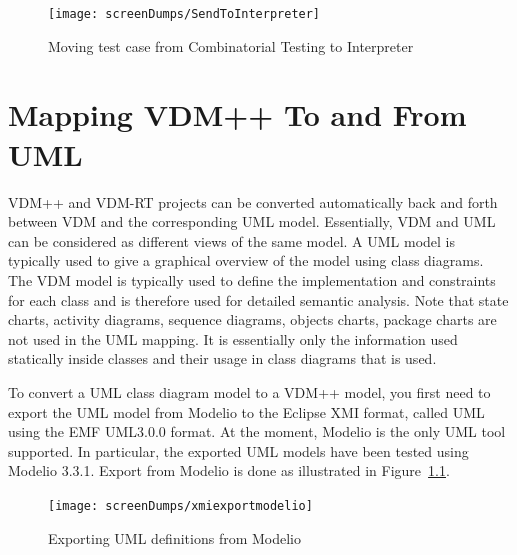 \documentclass{overturerepchap}
\begin{document}
\begin{figure}[htbp]
\begin{center}
\texttt{[image: screenDumps/SendToInterpreter]}
\caption{Moving test case from Combinatorial Testing to Interpreter\label{fig:SendToInterpreter}}
\end{center}
\end{figure}


%
%


\chapter{Mapping VDM++ To and From UML}\label{sec:vdmuml}

VDM++ and VDM-RT projects can be converted automatically back and forth between
VDM and the corresponding UML model.  Essentially, VDM and UML can be
considered as different views of the same model. A UML model is typically used
to give a graphical overview of the model using class diagrams.  The VDM model
is typically used to define the implementation and constraints for each class
and is therefore used for detailed semantic analysis. Note that state charts,
activity diagrams, sequence diagrams, objects charts, package charts are not
used in the UML mapping. It is essentially only the information
used statically inside classes and their usage in class diagrams that is used.

To convert a UML class diagram model to a VDM++ model, you first need
to export the UML model from Modelio to the Eclipse XMI
format, called UML using the EMF UML3.0.0 format. At the moment,
Modelio is the only UML tool supported. In particular,
the exported UML models have been tested using Modelio 3.3.1. Export
from Modelio is done as illustrated in Figure~\ref{fig:exportfromUML}.

\begin{figure}[htbp]
\begin{center}
\texttt{[image: screenDumps/xmiexportmodelio]}
\caption{Exporting UML definitions from Modelio\label{fig:exportfromUML}}
\end{center}
\end{figure}
\end{document}
